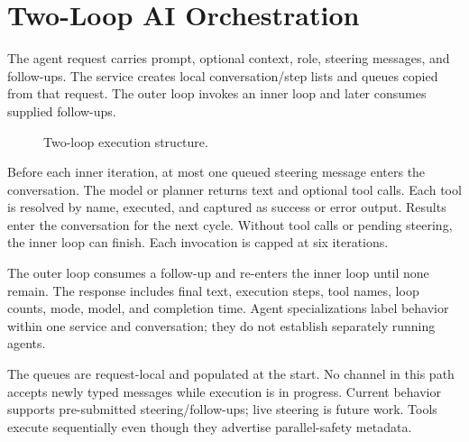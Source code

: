 \section{Two-Loop AI Orchestration}
The agent request carries prompt, optional context, role, steering messages, and follow-ups. The service creates local conversation/step lists and queues copied from that request. The outer loop invokes an inner loop and later consumes supplied follow-ups.
\begin{figure}[htbp]\centering{}\caption{Two-loop execution structure.}\label{fig:agent}\end{figure}

Before each inner iteration, at most one queued steering message enters the conversation. The model or planner returns text and optional tool calls. Each tool is resolved by name, executed, and captured as success or error output. Results enter the conversation for the next cycle. Without tool calls or pending steering, the inner loop can finish. Each invocation is capped at six iterations.

The outer loop consumes a follow-up and re-enters the inner loop until none remain. The response includes final text, execution steps, tool names, loop counts, mode, model, and completion time. Agent specializations label behavior within one service and conversation; they do not establish separately running agents.

The queues are request-local and populated at the start. No channel in this path accepts newly typed messages while execution is in progress. Current behavior supports pre-submitted steering/follow-ups; live steering is future work. Tools execute sequentially even though they advertise parallel-safety metadata.

